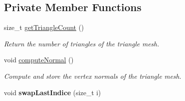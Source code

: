 \subsection*{Private Member Functions}
\begin{DoxyCompactItemize}
\item 
\mbox{\label{classvisilib_1_1_helper_triangle_mesh_ab503786c1185cd0c9709759cb6905c1a}} 
size\+\_\+t \mbox{\hyperlink{classvisilib_1_1_helper_triangle_mesh_ab503786c1185cd0c9709759cb6905c1a}{get\+Triangle\+Count}} ()
\begin{DoxyCompactList}\small\item\em Return the number of triangles of the triangle mesh. \end{DoxyCompactList}\item 
\mbox{\label{classvisilib_1_1_helper_triangle_mesh_a30b254ee3c7690c88c80aa671b4f00fa}} 
void \mbox{\hyperlink{classvisilib_1_1_helper_triangle_mesh_a30b254ee3c7690c88c80aa671b4f00fa}{compute\+Normal}} ()
\begin{DoxyCompactList}\small\item\em Compute and store the vertex normals of the triangle mesh. \end{DoxyCompactList}\item 
\mbox{\label{classvisilib_1_1_helper_triangle_mesh_ad98c96daaa0e4fb471fafe263a68c448}} 
void {\bfseries swap\+Last\+Indice} (size\+\_\+t i)
\end{DoxyCompactItemize}
